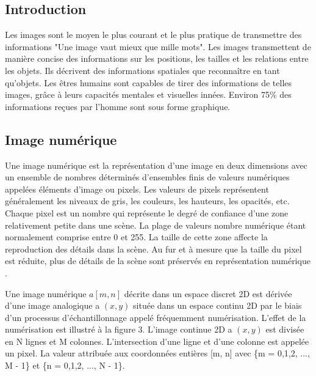 \documentclass[12pt]{article}
\begin{document}
\subsection{Introduction}
Les images sont le moyen le plus courant et le plus pratique de transmettre des informations "Une image vaut mieux que mille mots". Les images transmettent de manière concise des informations sur les positions, les tailles et les relations entre les objets. Ils décrivent des informations spatiales que reconnaître en tant qu'objets. Les êtres humains sont capables de tirer des informations de telles images, grâce à leurs capacités mentales et visuelles innées. Environ 75\% des informations reçues par l'homme sont sous forme graphique.

\subsection{Image numérique}
Une image numérique est la représentation d'une image en deux dimensions avec un ensemble de nombres déterminés d'ensembles finis de valeurs numériques appelées éléments d'image ou pixels. Les valeurs de pixels représentent généralement les niveaux de gris, les couleurs, les hauteurs, les opacités, etc. Chaque pixel est un nombre qui représente le degré de confiance d'une zone relativement petite dans une scène. La plage de valeurs nombre numérique étant normalement comprise entre 0 et 255. La taille de cette zone affecte la reproduction des détails dans la scène. Au fur et à mesure que la taille du pixel est réduite, plus de détails de la scène sont préservés en représentation numérique \cite{12}.

Une image numérique $a[m, n]$ décrite dans un espace discret 2D est dérivée d'une image analogique a $(x, y)$ située dans un espace continu 2D par le biais d'un processus d'échantillonnage appelé fréquemment numérisation. L'effet de la numérisation est illustré à la figure 3. L'image continue 2D a $(x, y)$ est divisée en N lignes et M colonnes. L'intersection d'une ligne et d'une colonne est appelée un pixel. La valeur attribuée aux coordonnées entières [m, n] avec \{m = 0,1,2, ..., M - 1\} et \{n = 0,1,2, ..., N - 1\}.
\end{document}
